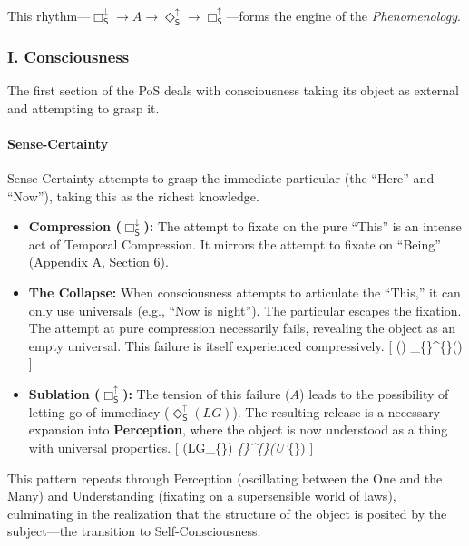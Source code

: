 This rhythm---\(\Box_{\mathsf{S}}^{\downarrow} \rightarrow A \rightarrow \Diamond_{\mathsf{S}}^{\uparrow} \rightarrow \Box_{\mathsf{S}}^{\uparrow}\)---forms the engine of the \emph{Phenomenology}.

\subsubsection{I. Consciousness}\label{i.-consciousness}

The first section of the PoS deals with consciousness taking its object as external and attempting to grasp it.

\paragraph{Sense-Certainty}\label{sense-certainty}

Sense-Certainty attempts to grasp the immediate particular (the ``Here'' and ``Now''), taking this as the richest knowledge.

\begin{itemize}
\tightlist
\item
  \textbf{Compression (\(\Box_{\mathsf{S}}^{\downarrow}\)):} The attempt to fixate on the pure ``This'' is an intense act of Temporal Compression. It mirrors the attempt to fixate on ``Being'' (Appendix A, Section 6).
\item
  \textbf{The Collapse:} When consciousness attempts to articulate the ``This,'' it can only use universals (e.g., ``Now is night''). The particular escapes the fixation. The attempt at pure compression necessarily fails, revealing the object as an empty universal. This failure is itself experienced compressively. {[} () \implies \Box\_\{\}\^{}\{\downarrow\}() {]}
\item
  \textbf{Sublation (\(\Box_{\mathsf{S}}^{\uparrow}\)):} The tension of this failure (\(A\)) leads to the possibility of letting go of immediacy (\(\Diamond_{\mathsf{S}}^{\uparrow}(LG)\)). The resulting release is a necessary expansion into \textbf{Perception}, where the object is now understood as a thing with universal properties. {[} (LG\_\{\}) \implies \Box\emph{\{\}\^{}\{\uparrow\}(U'}\{\}) {]}
\end{itemize}

This pattern repeats through Perception (oscillating between the One and the Many) and Understanding (fixating on a supersensible world of laws), culminating in the realization that the structure of the object is posited by the subject---the transition to Self-Consciousness.

